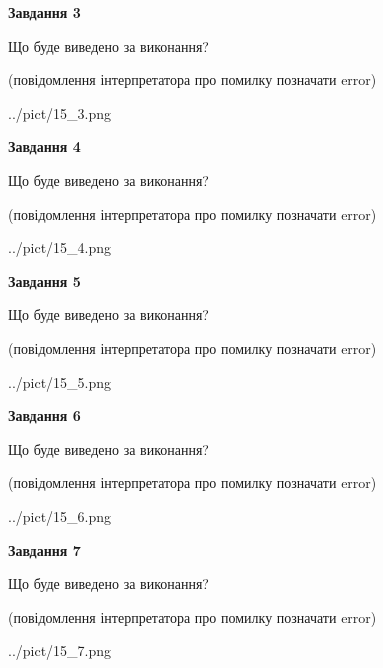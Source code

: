 \documentclass[12pt, ukrainian]{article}
\begin{document}
{\begin {large}
{\begin {center}\textbf{Завдання 3}\end {center}}\par
Що буде виведено за виконання?\par
 (повідомлення інтерпретатора про помилку позначати error)\par
\begin{center}
	{../pict/15_3.png}
\end{center}
\newpage

{\begin {center}\textbf{Завдання 4}\end {center}}\par
Що буде виведено за виконання?\par
 (повідомлення інтерпретатора про помилку позначати error)\par
\begin{center}
	{../pict/15_4.png}
\end{center}
\newpage

{\begin {center}\textbf{Завдання 5}\end {center}}\par
Що буде виведено за виконання?\par
 (повідомлення інтерпретатора про помилку позначати error)\par
\begin{center}
	{../pict/15_5.png}
\end{center}
\newpage

{\begin {center}\textbf{Завдання 6}\end {center}}\par
Що буде виведено за виконання?\par
 (повідомлення інтерпретатора про помилку позначати error)\par
\begin{center}
	{../pict/15_6.png}
\end{center}
\newpage

{\begin {center}\textbf{Завдання 7}\end {center}}\par
Що буде виведено за виконання?\par
 (повідомлення інтерпретатора про помилку позначати error)\par
\begin{center}
	{../pict/15_7.png}
\end{center}
\newpage


\end{large}}
\end{document}
